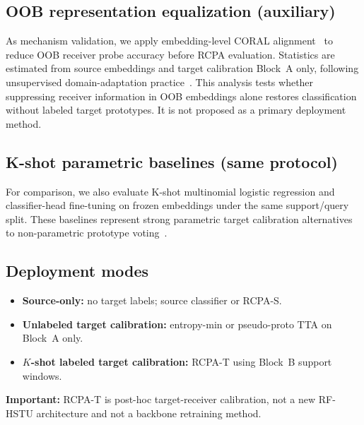 \subsection{OOB representation equalization (auxiliary)}
As mechanism validation, we apply embedding-level CORAL alignment~\cite{sun2016deepcoral} to reduce OOB receiver probe accuracy before RCPA evaluation.
Statistics are estimated from source embeddings and target calibration Block~A only, following unsupervised domain-adaptation practice~\cite{ben2010domain_adaptation,sun2016deepcoral}.
This analysis tests whether suppressing receiver information in OOB embeddings alone restores classification without labeled target prototypes.
It is not proposed as a primary deployment method.

\subsection{K-shot parametric baselines (same protocol)}
For comparison, we also evaluate K-shot multinomial logistic regression and classifier-head fine-tuning on frozen embeddings under the same support/query split.
These baselines represent strong parametric target calibration alternatives to non-parametric prototype voting~\cite{snell2017prototypical,wen2016center_loss}.

\subsection{Deployment modes}
\begin{itemize}
  \item \textbf{Source-only:} no target labels; source classifier or RCPA-S.
  \item \textbf{Unlabeled target calibration:} entropy-min or pseudo-proto TTA on Block~A only.
  \item \textbf{$K$-shot labeled target calibration:} RCPA-T using Block~B support windows.
\end{itemize}

\textbf{Important:} RCPA-T is post-hoc target-receiver calibration, not a new RF-HSTU architecture and not a backbone retraining method.
